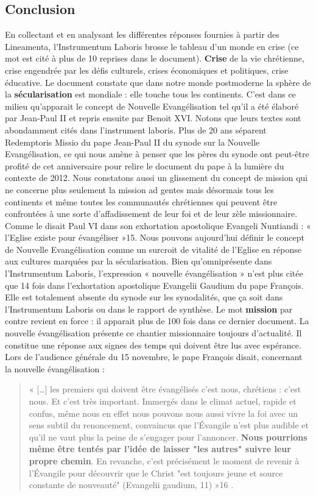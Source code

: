 \subsection{Conclusion}
En collectant et en analysant les différentes réponses fournies à partir des Lineamenta, l’Instrumentum
Laboris brosse le tableau d’un monde en crise (ce mot est cité à plus de 10 reprises dans le document).
\textbf{Crise} de la vie chrétienne, crise engendrée par les défis culturels, crises économiques et politiques,
crise éducative. Le document constate que dans notre monde postmoderne la sphère de la
\textbf{sécularisation} est mondiale : elle touche tous les continents.
C’est dans ce milieu qu’apparait le concept de Nouvelle Evangélisation tel qu’il a été élaboré par
Jean-Paul II et repris ensuite par Benoit XVI. Notons que leurs textes sont abondamment cités dans
l’instrument laboris. Plus de 20 ans séparent Redemptoris Missio du pape Jean-Paul II du synode sur
la Nouvelle Evangélisation, ce qui nous amène à penser que les pères du synode ont peut-être profité
de cet anniversaire pour relire le document du pape à la lumière du contexte de 2012.
Nous constatons aussi un glissement du concept de mission qui ne concerne plus seulement la mission
ad gentes mais désormais tous les continents et même toutes les communautés chrétiennes qui
peuvent être confrontées à une sorte d’affadissement de leur foi et de leur zèle missionnaire. Comme
le disait Paul VI dans son exhortation apostolique Evangeli Nuntiandi : « l’Eglise existe pour
évangéliser »15. Nous pouvons aujourd’hui définir le concept de Nouvelle Evangélisation comme un
surcroit de vitalité de l’Eglise en réponse aux cultures marquées par la sécularisation. Bien
qu’omniprésente dans l’Instrumentum Laboris, l’expression « nouvelle évangélisation » n’est plus
citée que 14 fois dans l’exhortation apostolique Evangelii Gaudium du pape François. 
 Elle est
totalement absente du synode sur les synodalités, que ça soit dans l’Instrumentum Laboris ou dans le
rapport de synthèse. Le mot \textbf{mission} par contre revient en force : il apparait plus de 100 fois dans ce
dernier document.
La nouvelle évangélisation présente ce chantier missionnaire toujours d’actualité. Il constitue une
réponse aux signes des temps qui doivent être lus avec espérance. Lors de l’audience générale du 15 novembre, le pape François disait, concernant la nouvelle évangélisation : \begin{quote}
    « […] les premiers qui
doivent être évangélisés c’est nous, chrétiens : c’est nous. Et c’est très important. Immergés dans le
climat actuel, rapide et confus, même nous en effet nous pouvons nous aussi vivre la foi avec un sens
subtil du renoncement, convaincus que l'Évangile n'est plus audible et qu'il ne vaut plus la peine de
s’engager pour l'annoncer. \textbf{Nous pourrions même être tentés par l'idée de laisser "les autres" suivre
leur propre chemin}. En revanche, c'est précisément le moment de revenir à l'Évangile pour découvrir
que le Christ "est toujours jeune et source constante de nouveauté" (Evangelii gaudium, 11) »16
.
\end{quote}


